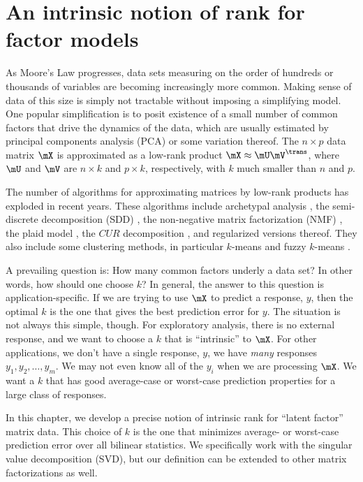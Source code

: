 
\chapter{An intrinsic notion of rank for factor models}

As Moore's Law progresses, data sets measuring on the order of hundreds or
thousands of variables are becoming increasingly more common. Making sense of
data of this size is simply not tractable without imposing a simplifying
model. One popular simplification is to posit existence of a small number of
common factors that drive the dynamics of the data, which are usually
estimated by principal components analysis (PCA) or some variation thereof.
The $n \times p$ data matrix $\mX$ is approximated as a low-rank product $\mX
\approx \mU \mV^\trans$, where $\mU$ and $\mV$ are $n \times k$ and $p \times
k$, respectively, with $k$ much smaller than $n$ and $p$.

The number of algorithms for approximating matrices by low-rank products has
exploded in recent years. These algorithms include archetypal analysis
\cite{cutler1994aa}, the semi-discrete decomposition (SDD)
\cite{kolda1998smd}, the non-negative matrix factorization (NMF)
\cite{lee1999lpo}, the plaid model \cite{lazzeroni2002pmg}, the $CUR$
decomposition \cite{drineas2007fmc}, and regularized versions thereof. They
also include some clustering methods, in particular $k$-means and fuzzy
$k$-means \cite{bezdek1980fmp}.

A prevailing question is: How many common factors underly a data set? In other
words, how should one choose $k$? In general, the answer to this question is
application-specific. If we are trying to use $\mX$ to predict a response,
$y$, then the optimal $k$ is the one that gives the best prediction error
for $y$. The situation is not always this simple, though. For exploratory
analysis, there is no external response, and we want to choose a $k$ that is
``intrinsic'' to $\mX$. For other applications, we don't have a single
response, $y$, we have \emph{many} responses $y_1, y_2, \ldots, y_m$.
We may not even know all of the $y_i$ when we are processing $\mX$. We want a $k$ that has good average-case or worst-case prediction properties for a large class of responses.

In this chapter, we develop a precise notion of intrinsic rank for ``latent
factor'' matrix data. This choice of $k$ is the one that minimizes average- or
worst-case prediction error over all bilinear statistics. We specifically work
with the singular value decomposition (SVD), but our definition can be
extended to other matrix factorizations as well.

